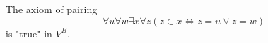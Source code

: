 The axiom of pairing
$$\forall u \forall w \exists x \forall z (z \in x \iff z = u \vee z = w)$$
is "true" in $V^B$.